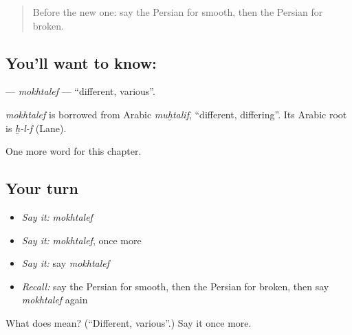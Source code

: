 \label{lesson:FA-C163-mokhtalef}



\begin{quote}
Before the new one: say the Persian for smooth, then the Persian for broken.
\end{quote}

\subsection*{You'll want to know: }
\textbf{} — \emph{mokhtalef} — \textquotedblleft{}different, various\textquotedblright{}.

\begin{cousinweb}
\emph{mokhtalef} is borrowed from Arabic \emph{muḫtalif}, \textquotedblleft{}different, differing\textquotedblright{}. Its Arabic root is \emph{ḫ-l-f} (Lane).
\end{cousinweb}

\begin{grammarlens}[title={What you've built}]
One more word for this chapter.
\end{grammarlens}

\subsection*{Your turn}
\begin{itemize}
\raggedright
  \item \emph{Say it:} \emph{mokhtalef}
  \item \emph{Say it:} \emph{mokhtalef}, once more
  \item \emph{Say it:} say \emph{mokhtalef}
  \item \emph{Recall:} say the Persian for smooth, then the Persian for broken, then say \emph{mokhtalef} again
\end{itemize}

\begin{tcolorbox}[breakable,colback=teal!4,colframe=teal!35!black,title={Before you move on}]
What does  mean? (\textquotedblleft{}Different, various\textquotedblright{}.) Say it once more.
\end{tcolorbox}
